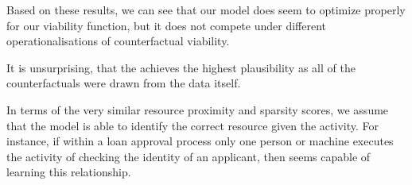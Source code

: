 \documentclass[./../../paper.tex]{subfiles}
\begin{document}
Based on these results, we can see that our model does seem to optimize properly for our viability function, but it does not compete under different operationalisations of counterfactual viability. 

It is unsurprising, that the \ModelCBG achieves the highest plausibility as all of the counterfactuals were drawn from the data itself. 

In terms of the very similar resource proximity and sparsity scores, we assume that the model is able to identify the correct resource given the activity. For instance, if within a loan approval process only one person or machine executes the activity of checking the identity of an applicant, then \ModelEVOFSR seems capable of learning this relationship.  
\end{document}
